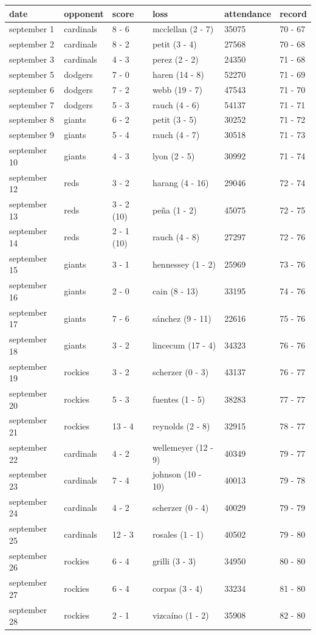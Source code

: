 \documentclass{article}
\begin{document}
\begin{tabular}{llllll}
\toprule
date & opponent & score & loss & attendance & record \\
\midrule
september 1 & cardinals & 8 - 6 & mcclellan (2 - 7) & 35075 & 70 - 67 \\
september 2 & cardinals & 8 - 2 & petit (3 - 4) & 27568 & 70 - 68 \\
september 3 & cardinals & 4 - 3 & perez (2 - 2) & 24350 & 71 - 68 \\
september 5 & dodgers & 7 - 0 & haren (14 - 8) & 52270 & 71 - 69 \\
september 6 & dodgers & 7 - 2 & webb (19 - 7) & 47543 & 71 - 70 \\
september 7 & dodgers & 5 - 3 & rauch (4 - 6) & 54137 & 71 - 71 \\
september 8 & giants & 6 - 2 & petit (3 - 5) & 30252 & 71 - 72 \\
september 9 & giants & 5 - 4 & rauch (4 - 7) & 30518 & 71 - 73 \\
september 10 & giants & 4 - 3 & lyon (2 - 5) & 30992 & 71 - 74 \\
september 12 & reds & 3 - 2 & harang (4 - 16) & 29046 & 72 - 74 \\
september 13 & reds & 3 - 2 (10) & peña (1 - 2) & 45075 & 72 - 75 \\
september 14 & reds & 2 - 1 (10) & rauch (4 - 8) & 27297 & 72 - 76 \\
september 15 & giants & 3 - 1 & hennessey (1 - 2) & 25969 & 73 - 76 \\
september 16 & giants & 2 - 0 & cain (8 - 13) & 33195 & 74 - 76 \\
september 17 & giants & 7 - 6 & sánchez (9 - 11) & 22616 & 75 - 76 \\
september 18 & giants & 3 - 2 & lincecum (17 - 4) & 34323 & 76 - 76 \\
september 19 & rockies & 3 - 2 & scherzer (0 - 3) & 43137 & 76 - 77 \\
september 20 & rockies & 5 - 3 & fuentes (1 - 5) & 38283 & 77 - 77 \\
september 21 & rockies & 13 - 4 & reynolds (2 - 8) & 32915 & 78 - 77 \\
september 22 & cardinals & 4 - 2 & wellemeyer (12 - 9) & 40349 & 79 - 77 \\
september 23 & cardinals & 7 - 4 & johnson (10 - 10) & 40013 & 79 - 78 \\
september 24 & cardinals & 4 - 2 & scherzer (0 - 4) & 40029 & 79 - 79 \\
september 25 & cardinals & 12 - 3 & rosales (1 - 1) & 40502 & 79 - 80 \\
september 26 & rockies & 6 - 4 & grilli (3 - 3) & 34950 & 80 - 80 \\
september 27 & rockies & 6 - 4 & corpas (3 - 4) & 33234 & 81 - 80 \\
september 28 & rockies & 2 - 1 & vizcaíno (1 - 2) & 35908 & 82 - 80 \\
\bottomrule
\end{tabular}
\end{document}
